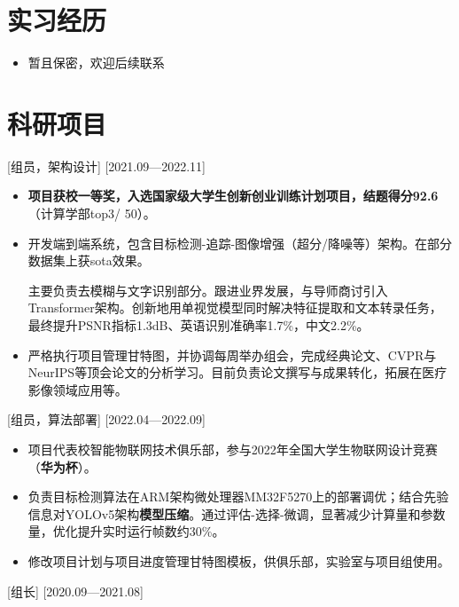 \documentclass{resume}
\begin{document}
\section{实习经历}


\begin{itemize}
  \item 暂且保密，欢迎后续联系
\end{itemize}

\section{科研项目}

[组员，架构设计]
[2021.09—2022.11] 

\begin{itemize}
  \item[] \textbf{项目获校一等奖，入选国家级大学生创新创业训练计划项目，结题得分92.6}（计算学部top3/ 50）。
  \item[] 开发端到端系统，包含目标检测-追踪-图像增强（超分/降噪等）架构。在部分数据集上获sota效果。

主要负责去模糊与文字识别部分。跟进业界发展，与导师商讨引入Transformer架构。创新地用单视觉模型同时解决特征提取和文本转录任务，最终提升PSNR指标1.3dB、英语识别准确率1.7\%，中文2.2\%。
  \item[] 严格执行项目管理甘特图，并协调每周举办组会，完成经典论文、CVPR与NeurIPS等顶会论文的分析学习。目前负责论文撰写与成果转化，拓展在医疗影像领域应用等。
\end{itemize}

[组员，算法部署]
[2022.04—2022.09] 

\begin{itemize}
  \item[] 项目代表校智能物联网技术俱乐部，参与2022年全国大学生物联网设计竞赛
（\textbf{华为杯}）。
  \item[] 负责目标检测算法在ARM架构微处理器MM32F5270上的部署调优；结合先验信息对YOLOv5架构\textbf{模型压缩}。通过评估-选择-微调，显著减少计算量和参数量，优化提升实时运行帧数约30\%。
  \item[] 修改项目计划与项目进度管理甘特图模板，供俱乐部，实验室与项目组使用。
\end{itemize}

[组长]
[2020.09—2021.08]
\end{document}
